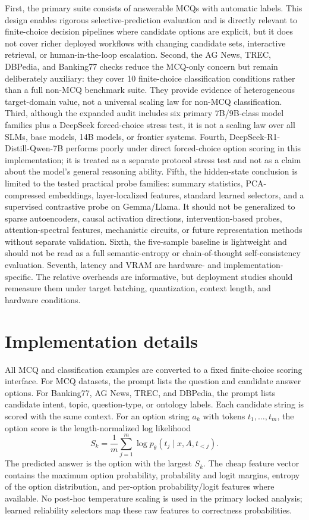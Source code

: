 \documentclass[preprint,12pt,authoryear]{elsarticle}
\begin{document}
First, the primary suite consists of answerable MCQs with automatic labels. This design enables rigorous selective-prediction evaluation and is directly relevant to finite-choice decision pipelines where candidate options are explicit, but it does not cover richer deployed workflows with changing candidate sets, interactive retrieval, or human-in-the-loop escalation. Second, the AG News, TREC, DBPedia, and Banking77 checks reduce the MCQ-only concern but remain deliberately auxiliary: they cover 10 finite-choice classification conditions rather than a full non-MCQ benchmark suite. They provide evidence of heterogeneous target-domain value, not a universal scaling law for non-MCQ classification. Third, although the expanded audit includes six primary 7B/9B-class model families plus a DeepSeek forced-choice stress test, it is not a scaling law over all SLMs, base models, 14B models, or frontier systems. Fourth, DeepSeek-R1-Distill-Qwen-7B performs poorly under direct forced-choice option scoring in this implementation; it is treated as a separate protocol stress test and not as a claim about the model's general reasoning ability. Fifth, the hidden-state conclusion is limited to the tested practical probe families: summary statistics, PCA-compressed embeddings, layer-localized features, standard learned selectors, and a supervised contrastive probe on Gemma/Llama. It should not be generalized to sparse autoencoders, causal activation directions, intervention-based probes, attention-spectral features, mechanistic circuits, or future representation methods without separate validation. Sixth, the five-sample baseline is lightweight and should not be read as a full semantic-entropy or chain-of-thought self-consistency evaluation. Seventh, latency and VRAM are hardware- and implementation-specific. The relative overheads are informative, but deployment studies should remeasure them under target batching, quantization, context length, and hardware conditions.


\section{Implementation details}
\label{sec:implementation-details}
All MCQ and classification examples are converted to a fixed finite-choice scoring interface. For MCQ datasets, the prompt lists the question and candidate answer options. For Banking77, AG News, TREC, and DBPedia, the prompt lists candidate intent, topic, question-type, or ontology labels. Each candidate string is scored with the same context. For an option string $a_k$ with tokens $t_1,\ldots,t_m$, the option score is the length-normalized log likelihood
\begin{equation}
S_k=\frac{1}{m}\sum_{j=1}^{m}\log p_\theta(t_j\mid x,A,t_{<j}).
\end{equation}
The predicted answer is the option with the largest $S_k$. The cheap feature vector contains the maximum option probability, probability and logit margins, entropy of the option distribution, and per-option probability/logit features where available. No post-hoc temperature scaling is used in the primary locked analysis; learned reliability selectors map these raw features to correctness probabilities.
\end{document}
